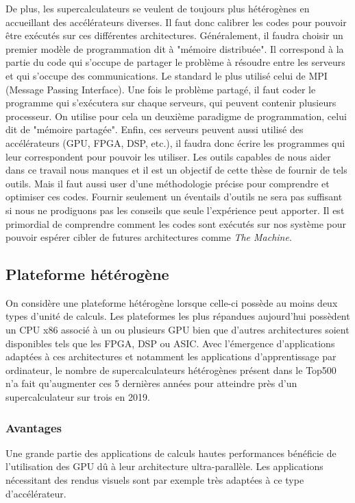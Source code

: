De plus, les supercalculateurs se veulent de toujours plus hétérogènes en accueillant des accélérateurs diverses. Il faut donc calibrer les codes pour pouvoir être exécutés sur ces différentes architectures. Généralement, il faudra choisir un premier modèle de programmation dit à "mémoire distribuée". Il correspond à la partie du code qui s'occupe de partager le problème à résoudre entre les serveurs et qui s'occupe des communications. Le standard le plus utilisé celui de MPI (Message Passing Interface). Une fois le problème partagé, il faut coder le programme qui s'exécutera sur chaque serveurs, qui peuvent contenir plusieurs processeur. On utilise pour cela un deuxième paradigme de programmation, celui dit de "mémoire partagée". Enfin, ces serveurs peuvent aussi utilisé des accélérateurs (GPU, FPGA, DSP, etc.), il faudra donc écrire les programmes qui leur correspondent pour pouvoir les utiliser.
Les outils capables de nous aider dans ce travail nous manques et il est un objectif de cette thèse de fournir de tels outils. Mais il faut aussi user d'une méthodologie précise pour comprendre et optimiser ces codes. Fournir seulement un éventails d'outils ne sera pas suffisant si nous ne prodiguons pas les conseils que seule l'expérience peut apporter. Il est primordial de comprendre comment les codes sont exécutés sur nos système pour pouvoir espérer cibler de futures architectures comme \textit{The Machine}.







\subsection{Plateforme hétérogène}\label{sec:edl_hpc_hetero}
    
    On considère une plateforme hétérogène lorsque celle-ci possède au moins deux types d'unité de calculs. Les plateformes les plus répandues aujourd'hui possèdent un CPU x86 associé à un ou plusieurs GPU bien que d'autres architectures soient disponibles tels que les FPGA, DSP ou ASIC. Avec l'émergence d'applications adaptées à ces architectures et notamment les applications d'apprentissage par ordinateur, le nombre de supercalculateurs hétérogènes présent dans le Top500 n'a fait qu'augmenter ces 5 dernières années pour atteindre près d'un supercalculateur sur trois en 2019.
    
    \subsubsection{Avantages}
        Une grande partie des applications de calculs hautes performances bénéficie de l'utilisation des GPU dû à leur architecture ultra-parallèle. Les applications nécessitant des rendus visuels sont par exemple très adaptées à ce type d'accélérateur. 
    

